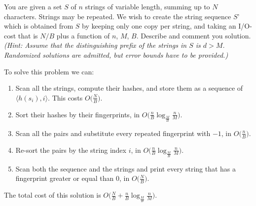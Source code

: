 \exercise

You are given a set $S$ of $n$ strings of variable length, summing up to $N$
characters. Strings may be repeated. We wish to create the string sequence $S’$
which is obtained from $S$ by keeping only one copy per string, and taking an
I/O-cost that is $N/B$ plus a function of $n$, $M$, $B$. Describe and comment
you solution. \emph{(Hint: Assume that the distinguishing prefix of the strings
in $S$ is $d > M$. Randomized solutions are admitted, but error bounds have to
be provided.)}

\solution

To solve this problem we can:
%
\begin{enumerate}

  \item Scan all the strings, compute their hashes, and store them as a sequence
  of $\langle h(s_i), i \rangle$. This costs $O\big(\frac{N}{B}\big)$.

  \item Sort their hashes by their fingerprints, in
  $O\big(\frac{n}{B}\log_{\frac{M}{B}} \frac{n}{M}\big)$.

  \item Scan all the pairs and substitute every repeated fingerprint with $-1$,
  in $O\big(\frac{n}{B}\big)$.

  \item Re-sort the pairs by the string index $i$, in
  $O\big(\frac{n}{B}\log_{\frac{M}{B}} \frac{n}{M}\big)$.

  \item Scan both the sequence and the strings and print every string that has a
  fingerprint greater or equal than 0, in $O\big(\frac{N}{B}\big)$.

\end{enumerate}
%
The total cost of this solution is $O\big(\frac{N}{B} +
\frac{n}{B}\log_{\frac{M}{B}} \frac{n}{M}\big)$.
